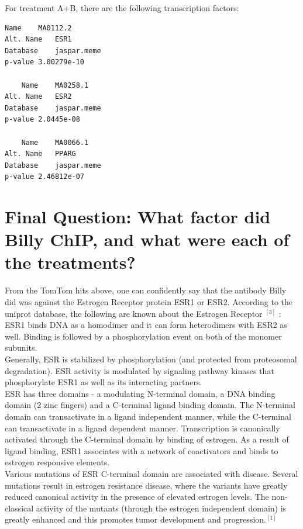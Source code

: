 \documentclass[a4paper,11pt]{article}
\begin{document}
\noindent For treatment A+B, there are the following transcription factors:
\begin{multicols}{3}
\noindent \begin{verbatim}
Name	MA0112.2
Alt. Name	ESR1
Database	jaspar.meme
p-value	3.00279e-10

	Name	MA0258.1
Alt. Name	ESR2
Database	jaspar.meme
p-value	2.0445e-08

	Name	MA0066.1
Alt. Name	PPARG
Database	jaspar.meme
p-value	2.46812e-07
\end{verbatim}
\end{multicols}
\section{Final Question: What factor did Billy ChIP, and what were each of the treatments?}
\noindent From the TomTom hits above, one can confidently say that the antibody Billy did was against the Estrogen Receptor protein ESR1 or ESR2. According to the uniprot database, the following are known about the Estrogen Receptor ${^{[3]}}$ :\\
\vspace{0.5 cm}
\noindent ESR1 binds DNA as a homodimer and it can form heterodimers with ESR2 as well. Binding is followed by a phosphorylation event on both of the monomer subunits.\\
\vspace{0.5 cm}
Generally, ESR is stabilized by phosphorylation (and protected from proteosomal degradation). ESR activity is modulated by signaling pathway kinases that phosphorylate ESR1 as well as its interacting partners.\\
\vspace{0.5 cm}
ESR has three domains - a modulating N-terminal domain, a DNA binding domain (2 zinc fingers) and a C-terminal ligand binding domain. The N-terminal domain can transactivate in a ligand independent manner, while the C-terminal can transactivate in a ligand dependent manner. Transcription is canonically activated through the C-terminal domain by binding of estrogen. As a result of ligand binding, ESR1 associates with a network of coactivators and binds to estrogen responsive elements.\\
\vspace{0.5 cm}
Various mutations of ESR C-terminal domain are associated with disease. Several mutations result in estrogen resistance disease, where the variants have greatly reduced canonical activity in the presence of elevated estrogen levels. The non-classical activity of the mutants (through the estrogen independent domain) is greatly enhanced and this promotes tumor development and progression.$^{[1]}$\\
\end{document}
